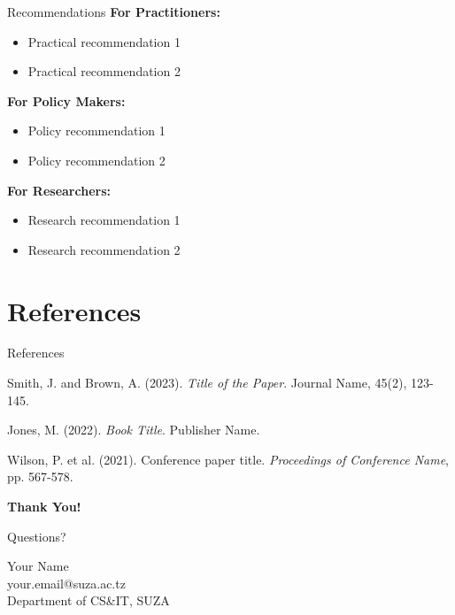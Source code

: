 \documentclass[aspectratio=169]{beamer}
\begin{document}
	\begin{frame}{Recommendations}
		\textbf{For Practitioners:}
		\begin{itemize}
			\item Practical recommendation 1
			\item Practical recommendation 2
		\end{itemize}
		
		\vspace{1em}
		
		\textbf{For Policy Makers:}
		\begin{itemize}
			\item Policy recommendation 1
			\item Policy recommendation 2
		\end{itemize}
		
		\vspace{1em}
		
		\textbf{For Researchers:}
		\begin{itemize}
			\item Research recommendation 1
			\item Research recommendation 2
		\end{itemize}
	\end{frame}
	
	\section*{References}
	
	\begin{frame}[allowframebreaks]{References}
		\scriptsize
		\begin{thebibliography}{99}
			
			Smith, J. and Brown, A. (2023).
			\textit{Title of the Paper}.
			Journal Name, 45(2), 123-145.
			
			Jones, M. (2022).
			\textit{Book Title}.
			Publisher Name.
			
			Wilson, P. et al. (2021).
			Conference paper title.
			\textit{Proceedings of Conference Name}, pp. 567-578.
			
		\end{thebibliography}
	\end{frame}
	
	\begin{frame}[plain]
		\centering
		\vspace{2em}
		
		{\Huge\textbf{Thank You!}}
		
		\vspace{2em}
		
		{\Large Questions?}
		
		\vspace{2em}
		
		{\normalsize
			Your Name\\
			your.email@suza.ac.tz\\
			Department of CS\&IT, SUZA}
	\end{frame}
	
\end{document}
